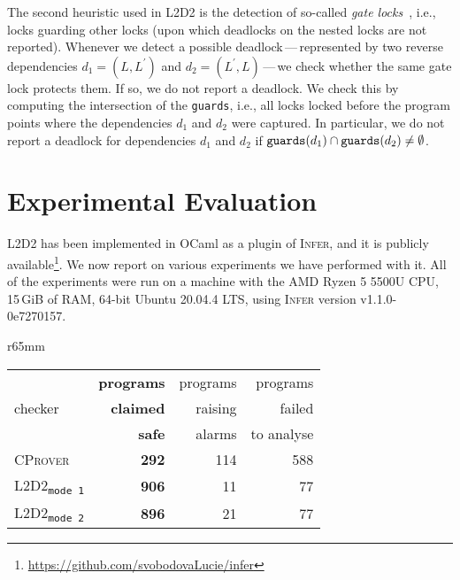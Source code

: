 \documentclass[runningheads]{llncs}
\newcommand{\LLDD}{\textsc{L2D2}\xspace} %
\newcommand{\Infer}{\textsc{Infer}\xspace}
\newcommand{\CProver}{\textsc{CProver}\xspace}
\newcommand{\mOne}{\texttt{mode\,1}\xspace}
\newcommand{\mTwo}{\texttt{mode\,2}\xspace}
\begin{document}
\enlargethispage{6mm}

The second heuristic used in \LLDD is the detection of so-called \emph{gate
locks}~\cite{goodlock00}, i.e., locks guarding other locks (upon which deadlocks
on the nested locks are not reported). Whenever we detect a possible
deadlock\,---\,represented by two reverse dependencies $d_1 = (L, L^\prime)$ and
$d_2 = (L^\prime, L)$\,---\,we check whether the same gate lock protects them.
If so, we do not report a deadlock. We check this by computing the intersection
of the \texttt{guards}, i.e., all locks locked before the program points where
the dependencies $d_1$ and $ d_2 $ were captured. In particular, we do not
report a deadlock for dependencies $d_1$ and $d_2$ if
$\text{\texttt{guards}}(d_1) \cap \text{\texttt{guards}}(d_2) \neq \emptyset$.

\vspace*{-4mm}\section{Experimental Evaluation}\vspace*{-2mm}
\label{sec:experiments}

\LLDD has been implemented in OCaml as a plugin of \Infer, and it is publicly
available\footnote{\url{https://github.com/svobodovaLucie/infer}}.
%
We now report on various experiments we have performed with it.
%
All of the experiments were run on a machine with the AMD Ryzen 5 5500U CPU,
15\,GiB of RAM, 64-bit Ubuntu 20.04.4 LTS, using \Infer version
v1.1.0-0e7270157.

\begin{wraptable}{r}{65mm}
    \begin{center}
        \vspace*{-14mm}
        \caption{Results of \LLDD and \CProver on non-deadlocking programs of
        the \CProver test-suite}
        \label{tab:resultsDebian}
        \vspace*{1mm}
        \begin{tabular}{l|r|r|r}
        & \textbf{programs} & programs & programs \\
        checker & \textbf{claimed} & raising & failed \\
        & \textbf{safe} & alarms & to analyse \\ \hline
        \textsc{\CProver}  & \textbf{292}   & 114   & 588 \\
        \textsc{\LLDD}\textsubscript{\mOne} & \textbf{906} & 11 & 77 \\
        \textsc{\LLDD}\textsubscript{\mTwo}  & \textbf{896} & 21 & 77
        \end{tabular}
    \end{center}
    \vspace*{-12mm}
\end{wraptable}
\end{document}
